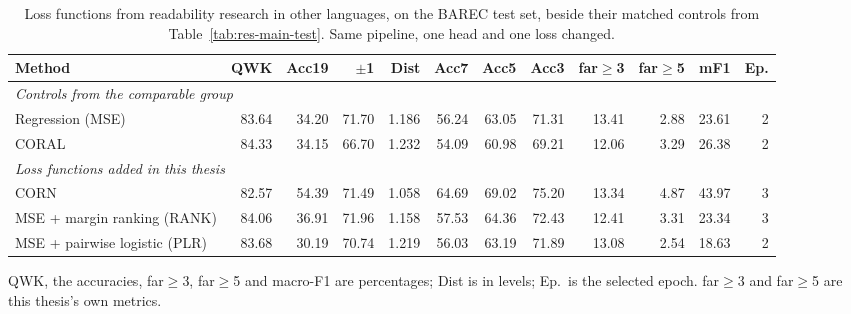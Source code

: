 \begin{table}[H]
\centering
\footnotesize
\caption{Loss functions from readability research in other languages, on the BAREC test set, beside their matched controls from Table~\ref{tab:res-main-test}. Same pipeline, one head and one loss changed.}
\label{tab:res-newloss-test}
\begin{adjustbox}{max width=\textwidth}
\begin{tabular}{lrrrrrrrrrrr}
\toprule
\textbf{Method} & \textbf{QWK} & \textbf{Acc19} & \textbf{$\pm$1} & \textbf{Dist} & \textbf{Acc7} & \textbf{Acc5} & \textbf{Acc3} & \textbf{far$\geq$3} & \textbf{far$\geq$5} & \textbf{mF1} & \textbf{Ep.} \\
\midrule
\multicolumn{12}{l}{\textit{Controls from the comparable group}} \\
\midrule
Regression (MSE) & 83.64 & 34.20 & 71.70 & 1.186 & 56.24 & 63.05 & 71.31 & 13.41 & 2.88 & 23.61 & 2 \\
CORAL & 84.33 & 34.15 & 66.70 & 1.232 & 54.09 & 60.98 & 69.21 & 12.06 & 3.29 & 26.38 & 2 \\
\midrule
\multicolumn{12}{l}{\textit{Loss functions added in this thesis}} \\
\midrule
CORN & 82.57 & 54.39 & 71.49 & 1.058 & 64.69 & 69.02 & 75.20 & 13.34 & 4.87 & 43.97 & 3 \\
MSE + margin ranking (RANK) & 84.06 & 36.91 & 71.96 & 1.158 & 57.53 & 64.36 & 72.43 & 12.41 & 3.31 & 23.34 & 3 \\
MSE + pairwise logistic (PLR) & 83.68 & 30.19 & 70.74 & 1.219 & 56.03 & 63.19 & 71.89 & 13.08 & 2.54 & 18.63 & 2 \\
\bottomrule
\end{tabular}
\end{adjustbox}

\vspace{0.1cm}
{\footnotesize QWK, the accuracies, far$\geq$3, far$\geq$5 and macro-F1 are percentages; Dist is in levels; Ep.\ is the selected epoch. far$\geq$3 and far$\geq$5 are this thesis's own metrics.}
\end{table}
